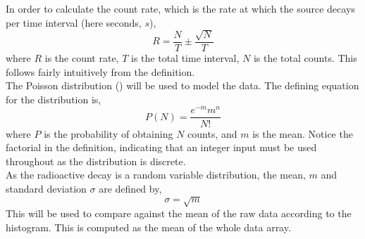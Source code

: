 \documentclass[11pt]{article}
\begin{document}
In order to calculate the count rate, which is the rate at which the source decays per time interval (here seconds, $s$), 
  \begin{equation} 
  R = \frac{N}{T} \pm \frac{\sqrt{N}}{T}
   \end{equation}
where $R$ is the count rate, $T$ is the total time interval, $N$ is the total counts. This follows fairly intuitively from the definition. \\
The Poisson distribution (\cite{hu2008poisson}) will be used to model the data. The defining equation for the distribution is, 
    \begin{equation}
        P(N) = \frac{e^{-m}m^{n}}{N!}
    \end{equation}
where $P$ is the probability of obtaining $N$ counts, and $m$ is the mean. Notice the factorial in the definition, indicating that an integer input must be used throughout as the distribution is discrete. \\
    As the radioactive decay is a random variable distribution, the mean, $m$ and standard deviation $\sigma$ are defined by,
    \begin{equation}
        \sigma = \sqrt{m}
    \end{equation}
This will be used to compare against the mean of the raw data according to the histogram. This is computed as the mean of the whole data array. 
\end{document}
